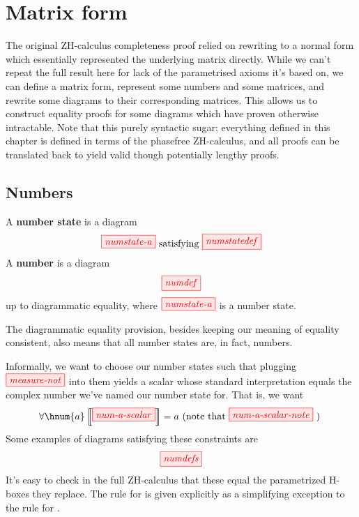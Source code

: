 \chapter{Matrix form}\label{chap:matrices}
The original ZH-calculus completeness proof relied on rewriting to a normal form
which essentially represented the underlying matrix directly. While we can't
repeat the full result here for lack of the parametrised axioms it's based on,
we can define a matrix form, represent some numbers and some matrices, and
rewrite some diagrams to their corresponding matrices. This allows us to
construct equality proofs for some diagrams which have proven otherwise
intractable. Note that this purely syntactic sugar; everything defined in this
chapter is defined in terms of the phasefree ZH-calculus, and all proofs can be
translated back to yield valid though potentially lengthy proofs.

\section{Numbers}

\begin{definition}
    A \textbf{number state} is a diagram
    $$\tikzfig{numstate-a} \text{ satisfying } \tikzfig{numstatedef}$$
    A \textbf{number} is a diagram 
    $$\tikzfig{numdef}$$
    up to diagrammatic equality, where $\tikzfig{numstate-a}$ is a number state.
\end{definition}
\begin{remark*}
    The diagrammatic equality provision, besides keeping our meaning of equality
    consistent, also means that all number states are, in fact, numbers.
\end{remark*}

Informally, we want to choose our number states such that plugging
$\tikzfig{measure-not}$ into them yields a scalar whose standard interpretation
equals the complex number we've named our number state for. That is, we want
$$\forall \hnum{a} \intf{\tikzfig{num-a-scalar}} = a \text{ (note that }
\tikzfig{num-a-scalar-note} \text{ ) }$$ 
Some examples of diagrams satisfying these constraints are
$$\tikzfig{numdefs}$$
It's easy to check in the full ZH-calculus that these equal the parametrized
H-boxes they replace. The rule for  is given explicitly as a
simplifying exception to the rule for .

